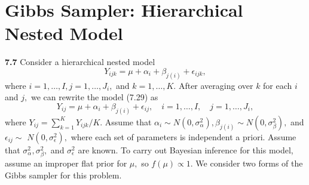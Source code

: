 \documentclass[11pt]{article}
\begin{document}
\section{Gibbs Sampler: Hierarchical Nested Model}
\textbf{7.7 }Consider a hierarchical nested model
$$
Y_{i j k}=\mu+\alpha_{i}+\beta_{j(i)}+\epsilon_{i j k},
$$
where $i=1, \ldots, I, j=1, \ldots, J_{i},$ and $k=1, \ldots, K .$ After averaging over $k$ for each $i$ and $j,$ we can rewrite the model (7.29) as
$$
Y_{i j}=\mu+\alpha_{i}+\beta_{j(i)}+\epsilon_{i j}, \quad i=1, \ldots, I, \quad j=1, \ldots, J_{i},
$$
where $Y_{i j}=\sum_{k=1}^{K} Y_{i j k} / K .$ Assume that $\alpha_{i} \sim N\left(0, \sigma_{\alpha}^{2}\right), \beta_{j(i)} \sim N\left(0, \sigma_{\beta}^{2}\right),$ and $\epsilon_{i j} \sim$
$N\left(0, \sigma_{\epsilon}^{2}\right),$ where each set of parameters is independent a priori. Assume that $\sigma_{\alpha}^{2}, \sigma_{\beta}^{2},$ and $\sigma_{\epsilon}^{2}$ are known. To carry out Bayesian inference for this model, assume an improper flat prior for $\mu,$ so $f(\mu) \propto 1 .$ We consider two forms of the Gibbs sampler for this problem.
\end{document}
